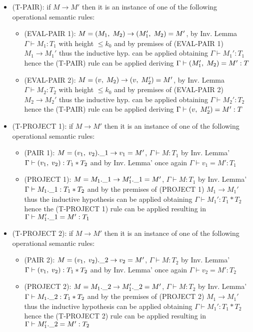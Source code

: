 \begin{itemize}
\item (T-PAIR): if $M \to M'$ then it is an instance of one of the
  following operational semantic rules:
  \begin{itemize}
  \item (EVAL-PAIR 1): $M = (M_1,\;M_2) \to (M_1',\;M_2) =
    M'$, by Inv. Lemma $\Gamma \vdash M_1: T_1$ with height $\le k_0$
    and by premises of (EVAL-PAIR 1) $M_1 \to M_1'$ thus the inductive
    hyp. can be applied obtaining $\Gamma \vdash M_1': T_1$ hence the
    (T-PAIR) rule can be applied deriving $\Gamma \vdash
    (M_1',\;M_2) = M': T$
  \item (EVAL-PAIR 2): $M = (v,\;M_2) \to (v,\;M_2') = M'$, by
    Inv. Lemma $\Gamma \vdash M_2: T_2$ with height $\le k_0$ and by
    premises of (EVAL-PAIR 2) $M_2 \to M_2'$ thus the inductive
    hyp. can be applied obtaining $\Gamma \vdash M_2': T_2$ hence the
    (T-PAIR) rule can be applied deriving $\Gamma \vdash
    (v,\;M_2') = M': T$
  \end{itemize}
\item (T-PROJECT 1): if $M \to M'$ then it is an instance of one of
  the following operational semantic rules:
  \begin{itemize}
  \item (PAIR 1): $M = (v_1,\;v_2).\_1 \to v_1 = M'$, $\Gamma
    \vdash M: T_1$ by Inv. Lemma' $\Gamma \vdash (v_1,\;v_2): T_1
    \ast T_2$ and by Inv. Lemma' once again $\Gamma \vdash v_1 = M':
    T_1$
  \item (PROJECT 1): $M = M_1.\_1 \to M_1'.\_1 = M'$, $\Gamma
    \vdash M: T_1$ by Inv. Lemma' $\Gamma \vdash M_1.\_1: T_1 \ast
    T_2$ and by the premises of (PROJECT 1) $M_1 \to M_1'$ thus the
    inductive hypothesis can be applied obtaining $\Gamma \vdash M_1':
    T_1 \ast T_2$ hence the (T-PROJECT 1) rule can be applied
    resulting in $\Gamma \vdash M_1'.\_1 = M': T_1$
  \end{itemize}
\item (T-PROJECT 2): if $M \to M'$ then it is an instance of one of
  the following operational semantic rules:
  \begin{itemize}
  \item (PAIR 2): $M = (v_1,\;v_2).\_2 \to v_2 = M'$, $\Gamma
    \vdash M: T_2$ by Inv. Lemma' $\Gamma \vdash (v_1,\;v_2): T_1
    \ast T_2$ and by Inv. Lemma' once again $\Gamma \vdash v_2 = M':
    T_2$
  \item (PROJECT 2): $M = M_1.\_2 \to M_1'.\_2 = M'$, $\Gamma
    \vdash M: T_2$ by Inv. Lemma' $\Gamma \vdash M_1.\_2: T_1 \ast
    T_2$ and by the premises of (PROJECT 2) $M_1 \to M_1'$ thus the
    inductive hypothesis can be applied obtaining $\Gamma \vdash M_1':
    T_1 \ast T_2$ hence the (T-PROJECT 2) rule can be applied
    resulting in $\Gamma \vdash M_1'.\_2 = M': T_2$
  \end{itemize}
\end{itemize}
